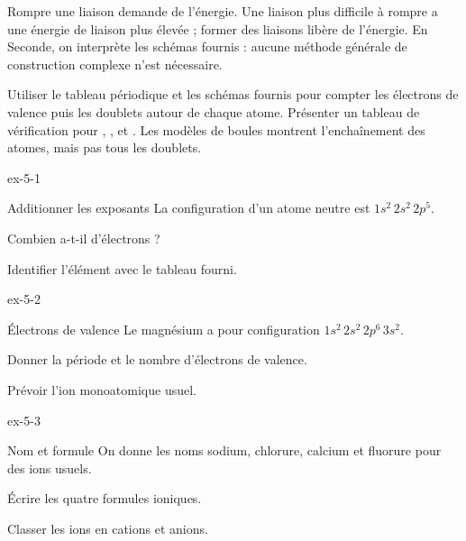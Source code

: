 Rompre une liaison demande de l'énergie. Une liaison plus difficile à rompre a une énergie de liaison plus élevée ; former des liaisons libère de l'énergie. En Seconde, on interprète les schémas fournis : aucune méthode générale de construction complexe n'est nécessaire.
\begin{experience}Utiliser le tableau périodique et les schémas fournis pour compter les électrons de valence puis les doublets autour de chaque atome. Présenter un tableau de vérification pour , ,  et . Les modèles de boules montrent l'enchaînement des atomes, mais pas tous les doublets.\end{experience}
\exercices
{}
\begin{blocLivre}{ex-5-1}\begin{exercice}[1]{Additionner les exposants}
La configuration d’un atome neutre est $1s^2\,2s^2\,2p^5$.
\begin{questions}
\item Combien a-t-il d’électrons ?
\item Identifier l’élément avec le tableau fourni.
\end{questions}
\end{exercice}\end{blocLivre}
\begin{blocLivre}{ex-5-2}\begin{exercice}[1]{Électrons de valence}
Le magnésium a pour configuration $1s^2\,2s^2\,2p^6\,3s^2$.
\begin{questions}
\item Donner la période et le nombre d’électrons de valence.
\item Prévoir l’ion monoatomique usuel.
\end{questions}
\end{exercice}\end{blocLivre}
\begin{blocLivre}{ex-5-3}\begin{exercice}[1]{Nom et formule}
On donne les noms sodium, chlorure, calcium et fluorure pour des ions usuels.
\begin{questions}
\item Écrire les quatre formules ioniques.
\item Classer les ions en cations et anions.
\end{questions}
\end{exercice}\end{blocLivre}
